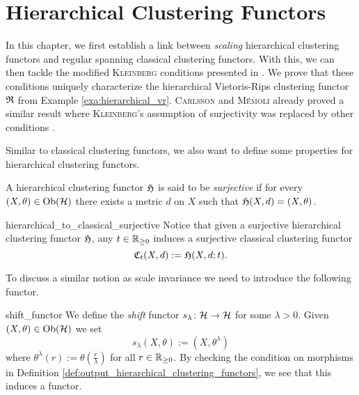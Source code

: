 \chapter{Hierarchical Clustering Functors}
\label{chapter__hierarchical}
In this chapter, we first establish a link between \emph{scaling} hierarchical clustering functors and regular spanning classical clustering functors.
%
With this, we can then tackle the modified \textsc{Kleinberg} conditions presented in \cite[Sec.~7.3.1]{Carlsson2010}.
We prove that these conditions uniquely characterize the hierarchical Vietoris-Rips clustering functor $\mathfrak{R}$ from Example \ref{exa:hierarchical_vr}. \textsc{Carlsson} and \textsc{M\'emoli} already proved a similar result where \textsc{Kleinberg}'s assumption of surjectivity was replaced by other conditions \cite[Thm.~18]{JMLR:v11:carlsson10a}.


Similar to classical clustering functors, we also want to define some properties for hierarchical clustering functors.

\begin{definition}{}{}
    A hierarchical clustering functor $\mathfrak{H}$ is said to be \emph{surjective} if for every ${(X, \theta) \in \mathrm {Ob}(\mathcal{H})}$ there exists a metric $d$ on $X$ such that $\mathfrak{H}(X,d) = (X, \theta)$.
\end{definition}

\begin{myremark}{}{hierarchical_to_classical_surjective}
Notice that given a surjective hierarchical clustering functor $\mathfrak{H}$, any $t \in \mathbb R_{\geq0}$ induces a surjective classical clustering functor
$$
\mathfrak{C}_t(X,d) := \mathfrak{H}(X, d; t).
$$
\end{myremark}


To discuss a similar notion as scale invariance we need to introduce the following functor.

\begin{definition}{\cite[Ex.~4.3]{Carlsson2010}}{shift_functor}
We define the \emph{shift} functor $s_\lambda\colon \mathcal{H} \to \mathcal{H}$ for some $\lambda > 0$. Given $(X, \theta) \in \mathrm {Ob}(\mathcal{H})$ we set
$$
s_\lambda(X, \theta) := (X, \theta^\lambda)
$$
where $\theta^\lambda(r) := \theta(\frac{r}{\lambda})$ for all $r \in \mathbb R_{\geq0}$.
By checking the condition on morphisms in Definition \ref{def:output_hierarchical_clustering_functors}, we see that this induces a functor.
\end{definition}

